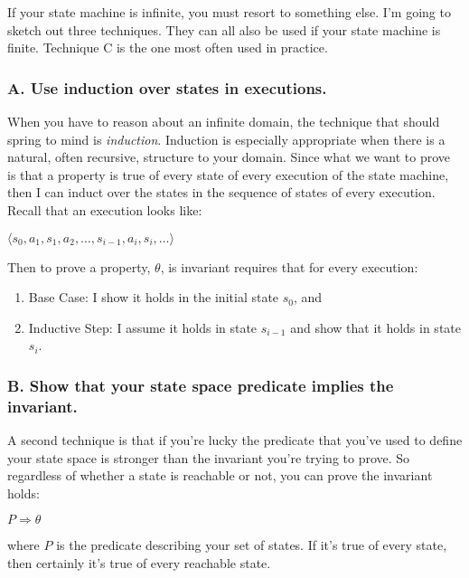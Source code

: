 If your state machine is infinite, you must resort to something else.
I'm going to sketch out three techniques.  They can all also be used
if your state machine is finite.  Technique C is the one most often used
in practice.

\subsubsection*{A. Use induction over states in executions.}

When you have to reason about an infinite domain, the
technique
that should spring to mind is {\em induction}.
Induction is especially appropriate
when there is a natural, often recursive, structure to your domain.
Since what we want to prove is that a property is true of
every state of every execution of the state machine, then I can
induct over the states in the sequence of states of every execution.
Recall that an execution looks like:

\begin{center}

$\langle s_0,  a_1, s_1, a_2,  \ldots,  s_{i-1}, a_i,  s_i, \ldots \rangle $ 

\end{center}

\noindent Then to prove a property, $\theta$, is invariant requires
that for every execution:
\begin{enumerate}
\item Base Case: I show it
holds in the initial state $s_0$, and

\item Inductive Step: I assume it holds in state $s_{i-1}$
and show that it holds in state $s_i$.
\end{enumerate}

\subsubsection*{B. Show that your state space predicate implies the invariant.}

A second technique is that if you're lucky the predicate that you've
used to define your state space is stronger than the invariant you're
trying to prove.  So regardless of whether a state is reachable or
not,
you can prove the invariant holds:

\begin{center}
$P \Rightarrow \theta$
\end{center}

\noindent where $P$ is the predicate describing your set of states.
If it's true of every state, then certainly it's true of every
reachable state.

